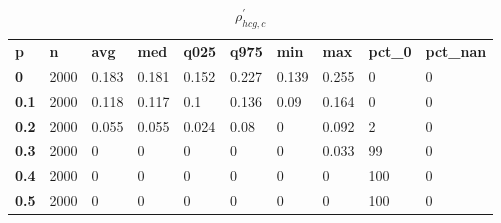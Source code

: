 \begin{table}[h]
 \centering 
\footnotesize
\caption{$\rho_{hcg,c}^\prime $}
\label{tab:alphahcgc}
\begin{tabular}[h]{| l l l l l l l l l l|
    } \hline
\textbf{ p} & \textbf{ n} & \textbf{ avg} & \textbf{ med} & \textbf{ q025} & \textbf{ q975} & \textbf{ min} & \textbf{ max} & \textbf{ pct\_0} & \textbf{ pct\_nan}
           \\
  \textbf{  0} & 2000 & 0.183 & 0.181 & 0.152 & 0.227 & 0.139 & 0.255 &   0 & 0
           \\
  \textbf{0.1} & 2000 & 0.118 & 0.117 &   0.1 & 0.136 &  0.09 & 0.164 &   0 & 0
           \\
  \textbf{0.2} & 2000 & 0.055 & 0.055 & 0.024 &  0.08 &     0 & 0.092 &   2 & 0
           \\
  \textbf{0.3} & 2000 &     0 &     0 &     0 &     0 &     0 & 0.033 &  99 & 0
           \\
  \textbf{0.4} & 2000 &     0 &     0 &     0 &     0 &     0 &     0 & 100 & 0
           \\
  \textbf{0.5} & 2000 &     0 &     0 &     0 &     0 &     0 &     0 & 100 & 0
           \\
 \hline \end{tabular}
 \end{table}
